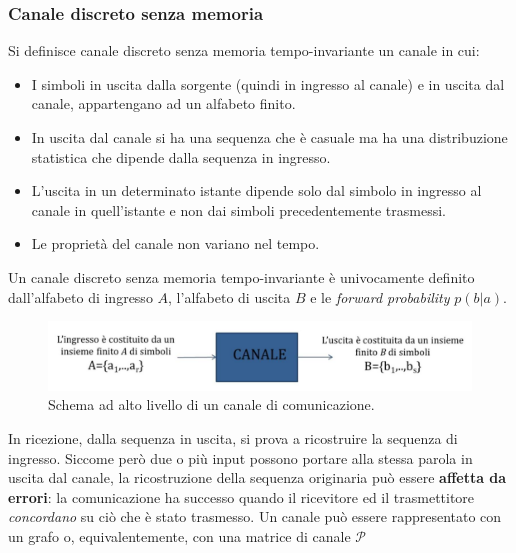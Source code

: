\subsubsection{Canale discreto senza memoria}
 Si definisce canale discreto senza memoria tempo-invariante un canale in cui:
\begin{itemize}
    \item I simboli in uscita dalla sorgente (quindi in ingresso al canale) e in uscita dal canale, appartengano ad un alfabeto finito.
    \item In uscita dal canale si ha una sequenza che è casuale ma ha una distribuzione statistica che dipende dalla sequenza in ingresso.
    \item L’uscita in un determinato istante dipende solo dal simbolo in ingresso al canale in quell’istante e non
dai simboli precedentemente trasmessi.
    \item Le proprietà del canale non variano nel tempo.
\end{itemize}
Un canale discreto senza memoria tempo-invariante è univocamente definito dall’alfabeto di ingresso $A$, l'alfabeto di uscita $B$ e le \textit{forward probability} $p(b|a)$.
\begin{figure}[H]
    \centering
    \includegraphics[width=\textwidth]{img/canale.jpg}
    \caption{Schema ad alto livello di un canale di comunicazione.}
    \label{fig:canale}
\end{figure}
In ricezione, dalla sequenza in uscita, si prova a ricostruire la sequenza di ingresso. Siccome per\`o due o più
input possono portare alla stessa parola in uscita dal canale, la ricostruzione della sequenza originaria può
essere \textbf{affetta da errori}: la comunicazione ha successo quando il ricevitore ed il trasmettitore \textit{concordano} su ciò che è stato trasmesso. Un canale può essere rappresentato con un grafo o, equivalentemente, con una matrice di canale $\mathcal{P}$

